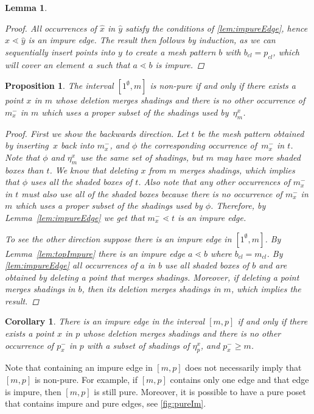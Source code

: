 \documentclass[preprint,11pt]{elsarticle}
\newtheorem{lem}[thm]{Lemma}\crefname{lem}{Lemma}{Lemmas}
\newtheorem{cor}[thm]{Corollary}\crefname{cor}{Corollary}{Corollaries}
\newtheorem{prop}[thm]{Proposition}\crefname{prop}{Proposition}{Propositions}
\newcommand\cl[1]{#1_{cl}}
\newcommand\occX[2]{\eta^{#2}_{#1}}
\newcommand\mX[2]{#1^{-}_{#2}}
\numberwithin{equation}{section}
\numberwithin{figure}{section}
\numberwithin{thm}{section}
\begin{document}
\begin{lem}
\begin{proof}
All occurrences of $\hat{x}$ in $\hat{y}$ satisfy
 the conditions of \cref{lem:impureEdge}, hence $\hat{x}\lessdot\hat{y}$ is an impure edge.
 The result then follows by induction, as we can sequentially insert points into $y$
 to create a mesh pattern $b$ with $\cl{b}=\cl{p}$, which will cover an element~$a$
 such that $a\lessdot b$ is impure.
\end{proof}
\end{lem}

\begin{prop}
The interval $[1^\emptyset,m]$ is non-pure if and
only if there exists a point $x$ in $m$ whose deletion merges shadings and
there is no other occurrence of $\mX{m}{x}$ in $m$ which uses a proper subset of the shadings
used by~$\occX{m}{x}$.
\begin{proof}
First we show the backwards direction. Let $t$  be the mesh pattern obtained by
inserting~$x$ back into $\mX{m}{x}$, and $\phi$ the corresponding occurrence of~$\mX{m}{x}$
in $t$. Note that $\phi$ and $\occX{m}{x}$ use the same set of shadings,
but $m$ may have more shaded boxes than $t$.
We know that deleting $x$ from $m$ merges shadings, which implies that $\phi$ uses all the
shaded boxes of $t$. 
Also note that any other occurrences of $\mX{m}{x}$ in $t$ must also use all of the shaded boxes
because there is no occurrence of $\mX{m}{x}$ in $m$ which uses a proper subset of the shadings
used by $\phi$. Therefore, by Lemma~\ref{lem:impureEdge} we get that
$\mX{m}{x}\lessdot t$ is an impure edge.

To see the other direction suppose there is an impure edge in $[1^{\emptyset},m]$. By
Lemma~\ref{lem:topImpure} there is an impure edge $a\lessdot b$ where
$\cl{b}=\cl{m}$. By \cref{lem:impureEdge} all occurrences of $a$ in
$b$ use all shaded boxes of $b$ and are obtained by deleting a point that merges
shadings. Moreover, if deleting a point merges shadings in $b$, then its deletion merges shadings in $m$,
which implies the result.
\end{proof}
\end{prop}

\begin{cor}
There is an impure edge in the interval $[m,p]$ if and only if there exists a
point $x$ in $p$ whose deletion merges shadings and there is no other
occurrence of $\mX{p}{x}$ in $p$ with a subset of shadings of $\occX{p}{x}$, and
$\mX{p}{x}\ge m$.
\end{cor}

Note that containing an impure edge in $[m,p]$ does not necessarily imply
that $[m,p]$ is non-pure. For example, if $[m,p]$ contains only one edge and
that edge is impure, then $[m,p]$ is still pure. Moreover, it is possible
to have a pure poset that contains impure and pure edges, see \cref{fig:pureIm}.
\end{document}
